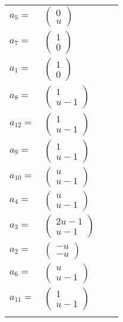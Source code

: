 \documentclass[1p]{elsarticle_modified}
\theoremstyle{definition}
\begin{document}
\begin{tabular}{m{7pt} m{180pt} m{7pt} m{180pt} }
\flushright $a_{5}=$&$\begin{pmatrix}0\\u\end{pmatrix}$ \\
\flushright $a_{7}=$&$\begin{pmatrix}1\\0\end{pmatrix}$ \\
\flushright $a_{1}=$&$\begin{pmatrix}1\\0\end{pmatrix}$ \\
\flushright $a_{8}=$&$\begin{pmatrix}1\\u-1\end{pmatrix}$ \\
\flushright $a_{12}=$&$\begin{pmatrix}1\\u-1\end{pmatrix}$ \\
\flushright $a_{9}=$&$\begin{pmatrix}1\\u-1\end{pmatrix}$ \\
\flushright $a_{10}=$&$\begin{pmatrix}u\\u-1\end{pmatrix}$ \\
\flushright $a_{4}=$&$\begin{pmatrix}u\\u-1\end{pmatrix}$ \\
\flushright $a_{3}=$&$\begin{pmatrix}2 u-1\\u-1\end{pmatrix}$ \\
\flushright $a_{2}=$&$\begin{pmatrix}- u\\- u\end{pmatrix}$ \\
\flushright $a_{6}=$&$\begin{pmatrix}u\\u-1\end{pmatrix}$ \\
\flushright $a_{11}=$&$\begin{pmatrix}1\\u-1\end{pmatrix}$\\&\end{tabular}
\end{document}

